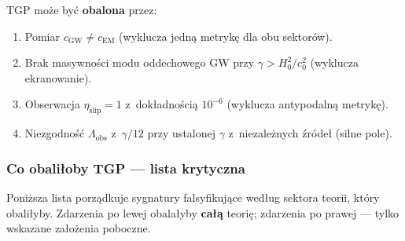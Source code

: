 \begin{remark}\label{rem:falsification-criteria}
TGP mo\.ze by\'c \textbf{obalona} przez:
\begin{enumerate}[nosep]
  \item Pomiar $c_{\mathrm{GW}} \neq c_{\mathrm{EM}}$
    (wyklucza jedn\k{a} metryk\k{e} dla obu sektor\'ow).
  \item Brak masywno\'sci modu oddechowego GW przy
    $\gamma > H_0^2/c_0^2$ (wyklucza ekranowanie).
  \item Obserwacja $\eta_{\mathrm{slip}} = 1$ z~dok\l{}adno\'sci\k{a}
    $10^{-6}$ (wyklucza antypodaln\k{a} metryk\k{e}).
  \item Niez\-godno\'s\'c $\Lambda_{\mathrm{obs}}$
    z~$\gamma/12$ przy ustalonej $\gamma$ z~niezale\.znych
    \'zr\'ode\l{} (silne pole).
\end{enumerate}
\end{remark}

\subsubsection{Co obali\l{}oby TGP --- lista krytyczna}
\label{sssec:co-obalic}

\begin{remark}\label{rem:falsification-hierarchy-formalizm}
Poni\.zsza lista porz\k{a}dkuje sygnatury falsyfikuj\k{a}ce wed\l{}ug
sektora teorii, kt\'ory obali\l{}yby. Zdarzenia po lewej
obala\l{}yby \textbf{ca\l{}\k{a}} teori\k{e}; zdarzenia po prawej ---
tylko wskazane za\l{}o\.zenia poboczne.
\end{remark}

